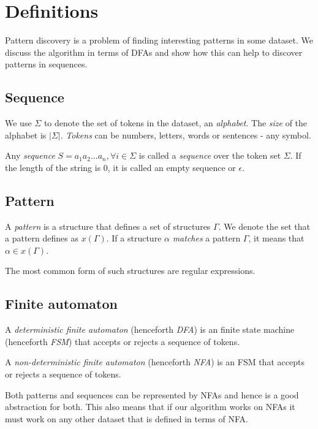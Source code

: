 \chapter{Definitions}

Pattern discovery is a problem of finding interesting patterns in
some dataset. We discuss the algorithm in terms of DFAs and
show how this can help to discover patterns in sequences.


\section{Sequence}

We use $\Sigma$ to denote the set of tokens in the dataset, an \emph{alphabet}. 
The \emph{size} of the alphabet is $|\Sigma|$. \emph{Tokens} can be numbers, 
letters, words or sentences - any symbol.

Any \emph{sequence} $S=a_1 a_2 ... a_n, \forall i \in \Sigma$ is called a \emph{sequence} 
over the token set $\Sigma$. If the length of the
string is $0$, it is called an empty sequence or $\epsilon$.

\section{Pattern}

A \emph{pattern} is a structure that defines a set of structures $\Gamma$. 
We denote the set that a pattern defines as $x(\Gamma)$.
If a structure $\alpha$ \emph{matches} a pattern $\Gamma$, it means that
$\alpha \in x(\Gamma)$.

The most common form of such structures are regular expressions.

\section{Finite automaton}

A \emph{deterministic finite automaton} (henceforth \emph{DFA}) is an 
finite state machine (henceforth \emph{FSM}) that accepts or rejects
a sequence of tokens. 

A \emph{non-deterministic finite automaton} (henceforth \emph{NFA}) is an 
FSM that accepts or rejects a sequence of tokens. 

Both patterns and sequences can be represented by NFAs and hence
is a good abstraction for both. This also means that if our algorithm
works on NFAs it must work on any other dataset that is defined in 
terms of NFA.


